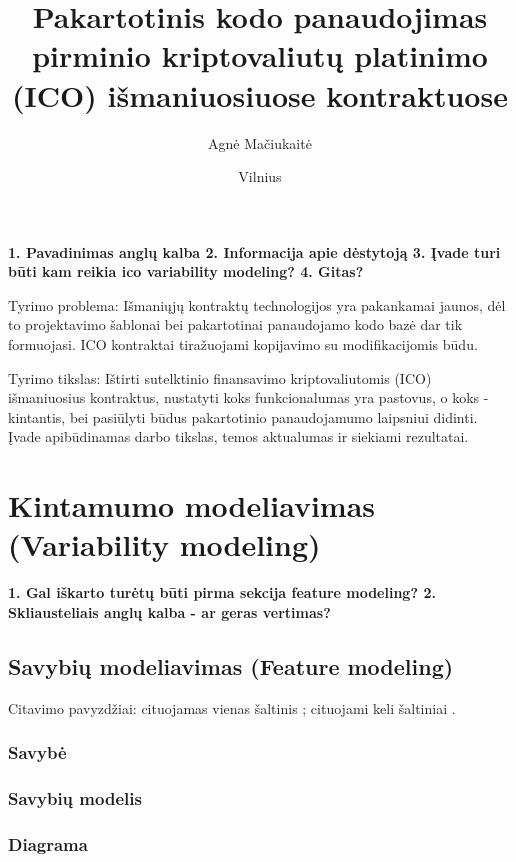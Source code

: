 \documentclass{VUMIFInfKursinis}
\title{Pakartotinis kodo panaudojimas pirminio kriptovaliutų platinimo (ICO) išmaniuosiuose kontraktuose}
\author{Agnė Mačiukaitė}
\date{Vilnius \\ \the\year}
\begin{document}
\maketitle

\tableofcontents

%
\textbf{1. Pavadinimas anglų kalba
2. Informacija apie dėstytoją
3. Įvade turi būti kam reikia ico variability modeling?
4. Gitas?}

Tyrimo problema: Išmaniųjų kontraktų technologijos yra pakankamai jaunos, dėl to projektavimo šablonai bei pakartotinai panaudojamo kodo bazė dar tik formuojasi. ICO kontraktai tiražuojami kopijavimo su modifikacijomis būdu.

Tyrimo tikslas: Ištirti sutelktinio finansavimo kriptovaliutomis (ICO) išmaniuosius kontraktus, nustatyti koks funkcionalumas yra pastovus, o koks - kintantis, bei pasiūlyti būdus pakartotinio panaudojamumo laipsniui didinti.
Įvade apibūdinamas darbo tikslas, temos aktualumas ir siekiami rezultatai.

\section{Kintamumo modeliavimas (Variability modeling)}
\textbf{1. Gal iškarto turėtų būti pirma sekcija feature modeling?
2. Skliausteliais anglų kalba - ar geras vertimas?}

\subsection{Savybių modeliavimas (Feature modeling)}
Citavimo pavyzdžiai: cituojamas vienas šaltinis \cite{Berger2010}; cituojami
keli šaltiniai \cite{PvzStraipsnEn, PvzKonfLt, PvzKonfEn, PvzKnygLt, PvzKnygEn,
PvzElPubLt, PvzElPubEn, PvzMagistrLt}.
\subsubsection{Savybė}
\subsubsection{Savybių modelis}
\subsubsection{Diagrama}
\end{document}
